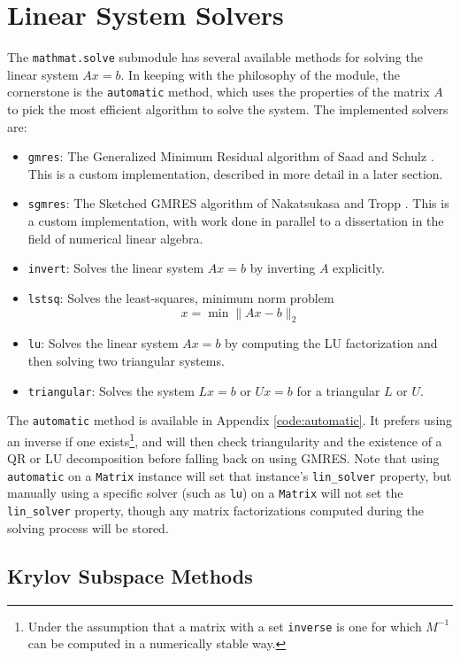 \documentclass[12pt,a4paper]{article}
\newcommand{\ct}[1]{\texttt{#1}}
\begin{document}
\section{Linear System Solvers}

The \ct{mathmat.solve} submodule has several available methods for solving the linear system $Ax = b$. In keeping with the philosophy of the module, the cornerstone is the \ct{automatic} method, which uses the properties of the matrix $A$ to pick the most efficient algorithm to solve the system. The implemented solvers are:

\begin{itemize}
    \item \ct{gmres}: The Generalized Minimum Residual algorithm of Saad and Schulz \cite{Saad1986}. This is a custom implementation, described in more detail in a later section.
    \item \ct{sgmres}: The Sketched GMRES algorithm of Nakatsukasa and Tropp \cite{Nakatsukasa2022}. This is a custom implementation, with work done in parallel to a dissertation in the field of numerical linear algebra.
    \item \ct{invert}: Solves the linear system $Ax = b$ by inverting $A$ explicitly.
    \item \ct{lstsq}: Solves the least-squares, minimum norm problem
    \[ x = \min \lVert Ax - b \rVert_2 \]
    \item \ct{lu}: Solves the linear system $Ax = b$ by computing the LU factorization and then solving two triangular systems.
    \item \ct{triangular}: Solves the system $Lx = b$ or $Ux = b$ for a triangular $L$ or $U$.
\end{itemize}
The \ct{automatic} method is available in Appendix \ref{code:automatic}. It prefers using an inverse if one exists\footnote{Under the assumption that a matrix with a set \ct{inverse} is one for which $M^{-1}$ can be computed in a numerically stable way.}, and will then check triangularity and the existence of a QR or LU decomposition before falling back on using GMRES. Note that using \ct{automatic} on a \ct{Matrix} instance will set that instance's \ct{lin\_solver} property, but manually using a specific solver (such as \ct{lu}) on a \ct{Matrix} will not set the \ct{lin\_solver} property, though any matrix factorizations computed during the solving process will be stored.

\subsection{Krylov Subspace Methods}
\end{document}
